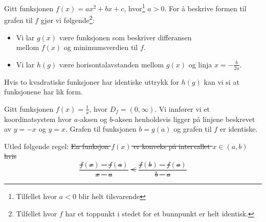 Gitt funksjonen $f(x)=ax^2+bx+c$, hvor\footnote{Tilfellet hvor $a<0$ blir helt tilsvarende} $a>0$.
For å beskrive formen til grafen til $f$ gjør vi følgende\footnote{Tilfellet hvor $f$ har et toppunkt i stedet for et bunnpunkt er helt identisk.}:
\begin{itemize}
	\item Vi lar $g(x)$ være funksjonen som beskriver differansen\\ mellom $f(x)$ og minimumsverdien til $f$.
	\item Vi lar $h(g)$ være horisontalavstanden mellom $g(x)$ og linja $x=-\frac{b}{2a}$.
\end{itemize}
Hvis to kvadratiske funksjoner har identiske uttrykk for $h(g)$ kan vi si at funksjonene har lik form.

\newpage
{}
Gitt funksjonen ${f(x)=\frac{1}{x}}$, hvor $D_f=(0, \infty)$. Vi innfører vi et koordinatsystem hvor $a$-aksen og $b$-aksen henholdsvis ligger på linjene beskrevet av $y=-x$ og $y=x$. Grafen til funksjonen $b=g(a)$ og grafen til $f$ er identiske.

Utled følgende regel:
\st{
En funksjon $f(x)$ er konveks på intervallet $x\in(a, b)$ hvis
\[ \frac{f(x)-f(a)}{x-a}<\frac{f(b)-f(a)}{b-a} \]
}

